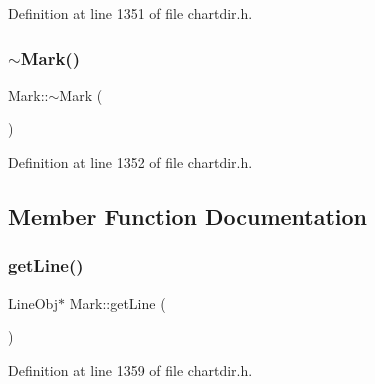 Definition at line 1351 of file chartdir.\+h.

\mbox{\label{class_mark_a36a64089bd6fdca80b5356f59e62c1b3}} 
\subsubsection{\texorpdfstring{$\sim$\+Mark()}{~Mark()}}
{\footnotesize\ttfamily Mark\+::$\sim$\+Mark (\begin{DoxyParamCaption}{ }\end{DoxyParamCaption})\hspace{0.3cm}{\ttfamily [inline]}}



Definition at line 1352 of file chartdir.\+h.



\subsection{Member Function Documentation}
\mbox{\label{class_mark_a7e623a0eef4340850fd13605f95b65d4}} 
\subsubsection{\texorpdfstring{get\+Line()}{getLine()}}
{\footnotesize\ttfamily Line\+Obj$\ast$ Mark\+::get\+Line (\begin{DoxyParamCaption}{ }\end{DoxyParamCaption})\hspace{0.3cm}{\ttfamily [inline]}}



Definition at line 1359 of file chartdir.\+h.

